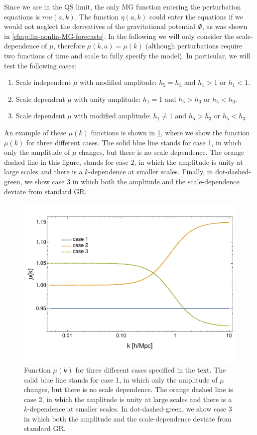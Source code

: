 Since we are in the QS limit, the only MG function entering the perturbation equations
is $mu(a,k)$. The function $\eta(a,k)$ could enter the equations
if we would not neglect the derivatives of the gravitational potential $\Phi$, as 
was shown in \cref{chap:lin-nonlin-MG-forecasts}.
In the following we will only consider the scale-dependence of $\mu$, therefore $\mu(k,a)=\mu(k)$ (although perturbations require
two functions of time and scale to fully specify the model). In particular,
we will test the following cases: 
\begin{enumerate} \label{enum:enumeration-cases}
	\item Scale independent $\mu$ with modified amplitude: $h_{5}=h_{3}$ and
	$h_{1}>1$ or $h_{1}<1$. 
	\item Scale dependent $\mu$ with unity amplitude: $h_{1}=1$ and $h_{5}>h_{3}$
	or $h_{5}<h_{3}$. 
	\item Scale dependent $\mu$ with modified amplitude: $h_{1}\neq1$ and
	$h_{5}>h_{3}\mbox{ or }h_{5}<h_{3}$. 
\end{enumerate}
An example of these $\mu(k)$ functions is shown in \cref{fig:Mu(k)function}, where we show the 
function $\mu(k)$ for three different cases. The solid blue line stands for case 1, in which only the amplitude of
$\mu$ changes, but there is no scale dependence. The orange dashed line in this figure, stands for case 2, 
in which the amplitude is unity at large scales and there is a $k$-dependence at smaller scales. 
Finally, in dot-dashed-green, we show case 3 in which both the amplitude and the scale-dependence deviate from standard GR.
\begin{figure}[htbp]
	\centering
	\includegraphics[width=0.75\linewidth]{Chapters/resummation-plots/mu-of-k-plots-3cases.pdf}
	\caption[MG function $\mu(k)$]{Function $\mu(k)$ for three different cases specified in the text. The solid blue line stands for case 1, in which only the amplitude of
	$\mu$ changes, but there is no scale dependence. The orange dashed line is case 2, 
in which the amplitude is unity at large scales and there is a $k$-dependence at smaller scales. In dot-dashed-green, we show case 3 in which both the amplitude and the scale-dependence deviate from standard GR.}
	\label{fig:Mu(k)function}
\end{figure}

